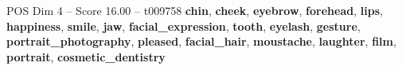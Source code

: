 \begin{textsample}{POS Dim 4 – Score 16.00 – t009758}  \label{ex:f4_pos_038}
\textbf{chin}, \textbf{cheek}, \textbf{eyebrow}, \textbf{forehead}, \textbf{lips}, \textbf{happiness}, \textbf{smile}, \textbf{jaw}, \textbf{facial\_expression}, \textbf{tooth}, \textbf{eyelash}, \textbf{gesture}, \textbf{portrait\_photography}, \textbf{pleased}, \textbf{facial\_hair}, \textbf{moustache}, \textbf{laughter}, \textbf{film}, \textbf{portrait}, \textbf{cosmetic\_dentistry}

\end{textsample}
